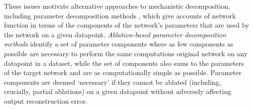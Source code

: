 \documentclass{article}
\begin{document}

These issues motivate alternative approaches to mechanistic decomposition, including parameter decomposition methods \cite{braun2025interpretabilityparameterspaceminimizing, bushnaq2025spd, chrisman2025identifyingsparselyactivecircuits}, which give accounts of network function in terms of the components of the network's parameters that are used by the network on a given datapoint. \textit{Ablation-based parameter decomposition methods} \cite{braun2025interpretabilityparameterspaceminimizing, bushnaq2025spd} identify a set of parameter components where as few components as possible are necessary to perform the same computations original network on any datapoint in a dataset, while the set of components also sums to the parameters of the target network and are as computationally simple as possible. Parameter components are deemed `necessary' if they cannot be ablated (including, crucially, partial ablations) on a given datapoint without adversely affecting output reconstruction error. 
\end{document}
